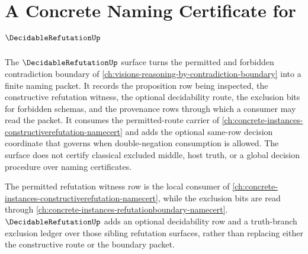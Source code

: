 \chapter{A Concrete Naming Certificate for $\DecidableRefutationUp$}
\label{ch:concrete-instances-decidablerefutation-namecert}

The $\DecidableRefutationUp$ surface turns the permitted and forbidden contradiction boundary of \autoref{ch:visions-reasoning-by-contradiction-boundary} into a finite naming packet. It records the proposition row being inspected, the constructive refutation witness, the optional decidability route, the exclusion bits for forbidden schemas, and the provenance rows through which a consumer may read the packet. It consumes the permitted-route carrier of \autoref{ch:concrete-instances-constructiverefutation-namecert} and adds the optional same-row decision coordinate that governs when double-negation consumption is allowed. The surface does not certify classical excluded middle, host truth, or a global decision procedure over naming certificates.

The permitted refutation witness row is the local consumer of \autoref{ch:concrete-instances-constructiverefutation-namecert}, while the exclusion bits are read through \autoref{ch:concrete-instances-refutationboundary-namecert}. $\DecidableRefutationUp$ adds an optional decidability row and a truth-branch exclusion ledger over those sibling refutation surfaces, rather than replacing either the constructive route or the boundary packet.

